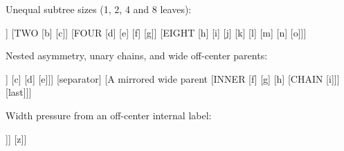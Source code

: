 \documentclass{article}
\begin{document}
Unequal subtree sizes (1, 2, 4 and 8 leaves):
\begin{fittedterminaltree}
  [ROOT
    [ONE [a]]
    [TWO [b] [c]]
    [FOUR [d] [e] [f] [g]]
    [EIGHT [h] [i] [j] [k] [l] [m] [n] [o]]]
\end{fittedterminaltree}

Nested asymmetry, unary chains, and wide off-center parents:
\begin{fittedterminaltree}
  [ROOT
    [A wide asymmetric parent
      [short]
      [INNER [CHAIN [b]] [c] [d] [e]]]
    [separator]
    [A mirrored wide parent
      [INNER [f] [g] [h] [CHAIN [i]]]
      [last]]]
\end{fittedterminaltree}

Width pressure from an off-center internal label:
\begin{fittedterminaltree}
  [ROOT
    [A deliberately wide asymmetric internal label
      [a]
      [B [b] [c] [d] [e] [f] [g] [h]]]
    [z]]
\end{fittedterminaltree}
\end{document}
